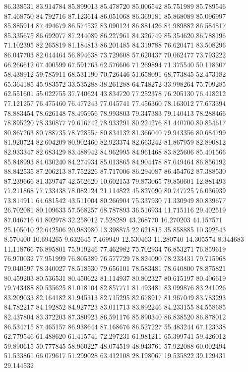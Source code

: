 86.338531
83.914784
85.899013
85.478720
85.006542
85.751989
85.789546
87.468750
84.792716
87.123614
86.051068
86.369181
85.868089
85.096997
85.885914
87.494679
86.574532
83.090124
86.881426
84.989882
86.584817
85.335675
86.692077
87.244089
86.227961
84.326749
85.354620
86.788196
71.102395
82.265819
81.184813
86.201485
84.319788
76.620471
83.508296
86.047703
82.044464
56.894638
73.729608
57.620437
70.062477
73.793222
66.266612
67.400599
67.591763
62.576606
71.269894
71.375540
50.118307
58.438912
59.785911
68.531190
70.726446
51.658091
68.773845
52.473182
65.364185
45.983572
33.535288
38.261288
64.748272
33.998264
75.709285
62.551601
55.022755
37.740624
43.834720
77.252378
76.205130
76.418212
77.121257
76.475460
76.477243
77.045741
77.456360
78.163012
77.673394
78.883454
78.626148
78.495956
78.993803
79.347383
79.140413
78.288466
78.895220
78.330877
79.616742
78.933291
80.224276
81.440700
80.854617
80.867263
80.788735
78.728557
80.834132
81.366040
79.943356
80.684799
81.920724
82.604209
80.902460
82.923374
82.663242
81.867959
82.890812
82.933347
82.683429
83.488942
84.962995
84.961468
83.825606
85.401566
85.848993
84.030240
84.274934
85.013865
84.904478
87.649464
86.856192
88.842535
87.206213
87.752226
87.717006
86.294087
86.454762
87.388530
87.239666
81.339747
42.562620
10.602153
79.873065
79.850601
12.881493
77.211868
77.733438
78.082124
21.114822
45.827090
80.747725
76.036939
73.814911
64.681542
43.511004
80.266904
75.337930
71.330949
80.839677
26.702081
80.109633
57.568257
68.787893
36.516934
11.715116
29.402519
87.046716
61.802978
32.258012
7.528289
43.268770
16.270203
44.157571
25.105010
22.642506
20.983980
13.398875
22.621815
35.858885
10.392543
8.570400
10.694265
9.632645
7.469949
12.530463
11.280740
14.305574
8.344683
11.118766
76.895801
75.919246
77.462982
75.702934
76.853271
76.859619
76.970032
77.951999
76.805389
76.577729
78.824090
78.233431
79.715968
79.040597
78.340027
78.518530
79.656101
78.583481
78.640800
78.875821
80.459203
80.536531
80.450622
81.114937
80.802327
80.615197
80.406619
79.743488
80.535625
81.018104
82.857771
81.493481
83.099876
83.241026
83.209033
82.164182
81.945313
82.715295
82.678917
81.967049
83.783293
84.782217
84.192852
84.927723
83.011713
83.892246
84.233155
84.558685
82.437804
83.372203
87.380923
86.591176
85.890340
86.838520
86.878012
86.534715
87.465157
86.938644
87.168676
86.527227
55.483244
67.123338
62.779546
61.488620
61.415741
72.297231
61.981211
65.399741
59.426012
59.890615
50.777845
58.960227
48.074519
48.943761
57.922088
60.002494
51.533861
66.079617
51.299028
63.412108
28.198067
19.535822
39.129431
29.144532
